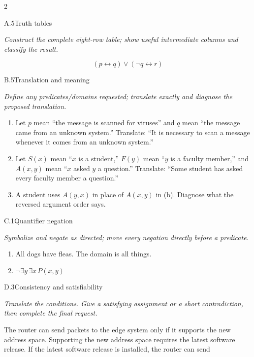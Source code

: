 \documentclass[9pt]{extarticle}
\begin{document}
\begin{multicols}{2}
\begin{CoreProblem}{A.5}{Truth tables}
{\scriptsize\textit{Construct the complete eight-row table; show useful intermediate columns and classify the result.}\par}
\[
  (p\leftrightarrow q)\lor(\neg q\leftrightarrow r)
\]
\end{CoreProblem}
\begin{CoreProblem}{B.5}{Translation and meaning}
{\scriptsize\textit{Define any predicates/domains requested; translate exactly and diagnose the proposed translation.}\par}
\begin{enumerate}[label=(\alph*)]
  \item Let $p$ mean ``the message is scanned for viruses'' and $q$ mean ``the
        message came from an unknown system.'' Translate: ``It is necessary to
        scan a message whenever it comes from an unknown system.''
  \item Let $S(x)$ mean ``$x$ is a student,'' $F(y)$ mean ``$y$ is a faculty
        member,'' and $A(x,y)$ mean ``$x$ asked $y$ a question.'' Translate:
        ``Some student has asked every faculty member a question.''
  \item A student uses $A(y,x)$ in place of $A(x,y)$ in (b). Diagnose what the
        reversed argument order says.
\end{enumerate}
\end{CoreProblem}
\begin{CoreProblem}{C.1}{Quantifier negation}
{\scriptsize\textit{Symbolize and negate as directed; move every negation directly before a predicate.}\par}
\begin{enumerate}[label=(\alph*)]
  \item All dogs have fleas. The domain is all things.
  \item $\neg\exists y\,\exists x\,P(x,y)$
\end{enumerate}
\end{CoreProblem}
\columnbreak
\begin{CoreProblem}{D.3}{Consistency and satisfiability}
{\scriptsize\textit{Translate the conditions. Give a satisfying assignment or a short contradiction, then complete the final request.}\par}
The router can send packets to the edge system only if it supports the new
address space. Supporting the new address space requires the latest software
release. If the latest software release is installed, the router can send

\end{CoreProblem}
\end{multicols}
\end{document}
